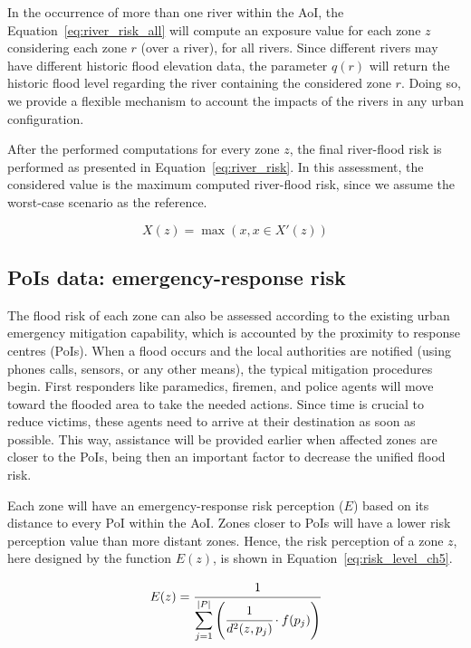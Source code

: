 \begin{refsection}
In the occurrence of more than one river within the AoI, the Equation~\ref{eq:river_risk_all} will compute an exposure value for each zone $z$ considering each zone $r$ (over a river), for all rivers. Since different rivers may have different historic flood elevation data, the parameter $q(r)$ will return the historic flood level regarding the river containing the considered zone $r$. Doing so, we provide a flexible mechanism to account the impacts of the rivers in any urban configuration. 

After the performed computations for every zone $z$, the final river-flood risk is performed as presented in Equation~\ref{eq:river_risk}. In this assessment, the considered value is the maximum computed river-flood risk, since we assume the worst-case scenario as the reference.

\begin{equation}
  \label{eq:river_risk}
  X(z) = \max({x, x \in X'(z)})
\end{equation}

\subsection{PoIs data: emergency-response risk}

The flood risk of each zone can also be assessed according to the existing urban emergency mitigation capability, which is accounted by the proximity to response centres (PoIs). When a flood occurs and the local authorities are notified (using phones calls, sensors, or any other means), the typical mitigation procedures begin. First responders like paramedics, firemen, and police agents will move toward the flooded area to take the needed actions. Since time is crucial to reduce victims, these agents need to arrive at their destination as soon as possible. This way, assistance will be provided earlier when affected zones are closer to the PoIs, being then an important factor to decrease the unified flood risk.

Each zone will have an emergency-response risk perception ($E$) based on its distance to every PoI within the AoI. Zones closer to PoIs will have a lower risk perception value than more distant zones. Hence, the risk perception of a zone $z$, here designed by the function $E(z)$, is shown in Equation~\ref{eq:risk_level_ch5}.

\begin{equation}
  \label{eq:risk_level_ch5}
  E(z) = \cfrac{1}{\displaystyle\sum_{j = 1}^{\lvert P \rvert}\left(\cfrac{1}{d^2(z, p_j)} \cdot f(p_j)\right)} 
\end{equation}


\end{refsection}
